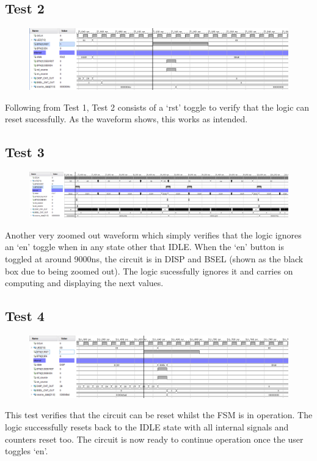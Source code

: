 \documentclass[11pt]{report}
\begin{document}
\subsection*{Test 2}
\begin{figure}[H]
    \includegraphics[width=\columnwidth]{Assets/test2.png}
\end{figure}
Following from Test 1, Test 2 consists of a `rst' toggle to verify that the logic can reset sucessfully. As
the waveform shows, this works as intended.

\subsection*{Test 3}
\begin{figure}[H]
    \includegraphics[width=\columnwidth]{Assets/test3.png}
\end{figure}
Another very zoomed out waveform which simply verifies that the logic ignores an `en' toggle when in any state
other that IDLE. When the `en' button is toggled at around 9000ns, the circuit is in DISP and BSEL
(shown as the black box due to being zoomed out). The logic sucessfully ignores it and carries on computing and
displaying the next values.

\subsection*{Test 4}
\begin{figure}[H]
    \includegraphics[width=\columnwidth]{Assets/test4.png}
\end{figure}
This test verifies that the circuit can be reset whilst the FSM is in operation. The logic successfully resets
back to the IDLE state with all internal signals and counters reset too. The circuit is now ready to continue
operation once the user toggles `en'. 
\end{document}
